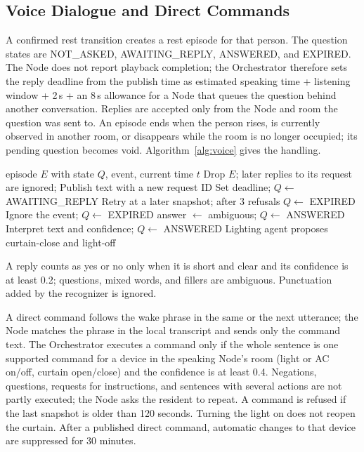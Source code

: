 \documentclass[conference]{IEEEtran}
\begin{document}
\subsection{Voice Dialogue and Direct Commands}
\label{sec:voice}

A confirmed rest transition creates a rest episode for that person.
The question states are NOT\_ASKED, AWAITING\_REPLY, ANSWERED, and
EXPIRED. The Node does not report playback completion; the
Orchestrator therefore sets the reply deadline from the publish
time as estimated speaking time + listening window + 2\,s + an
8\,s allowance for a Node that queues the question behind another
conversation. Replies are accepted only from the Node and room the
question was sent to. An episode ends when the person rises, is
currently observed in another room, or disappears while the room is
no longer occupied; its pending question becomes void.
Algorithm~\ref{alg:voice} gives the handling.

\begin{algorithm}[!tbp]
\caption{One-question-per-rest dialogue}
\label{alg:voice}
\footnotesize
\begin{algorithmic}[1]
\Require episode $E$ with state $Q$, event, current time $t$
  \State Drop $E$; later replies to its request are ignored; \Return
\EndIf
{}
  \State Publish text with a new request ID
    \State Set deadline; $Q\gets$ AWAITING\_REPLY
  \Else
    \State Retry at a later snapshot; after 3 refusals $Q\gets$ EXPIRED
  \EndIf
  \State \Return
\EndIf
{}
  \State Ignore the event; \Return
\EndIf
{}
  \State $Q\gets$ EXPIRED
  \State answer $\gets$ ambiguous; $Q\gets$ ANSWERED
  \State Interpret text and confidence; $Q\gets$ ANSWERED
    \State Lighting agent proposes curtain-close and light-off
  \EndIf
\EndIf
\end{algorithmic}
\end{algorithm}

A reply counts as yes or no only when it is short and clear and its
confidence is at least 0.2; questions, mixed words, and fillers are
ambiguous. Punctuation added by the recognizer is ignored.

A direct command follows the wake phrase in the same or the next
utterance; the Node matches the phrase in the local transcript and
sends only the command text. The Orchestrator executes a command only
if the whole sentence is one supported command for a device in the
speaking Node's room (light or AC on/off, curtain open/close) and the
confidence is at least 0.4. Negations, questions, requests for
instructions, and sentences with several actions are not partly
executed; the Node asks the resident to repeat. A command is refused
if the last snapshot is older than 120 seconds. Turning the light on
does not reopen the curtain. After a published direct command,
automatic changes to that device are suppressed for 30 minutes.
\end{document}
